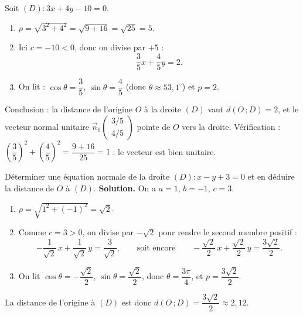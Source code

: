 \documentclass[11pt]{article}
\begin{document}
\begin{exemplebox}
Soit $(D) : 3x + 4y - 10 = 0$.
\begin{enumerate}
\item $\rho = \sqrt{3^2+4^2} = \sqrt{9+16} = \sqrt{25} = 5$.
\item Ici $c = -10 < 0$, donc on divise par $+5$ :
\[ \frac{3}{5}x + \frac{4}{5}y = 2. \]
\item On lit : $\cos\theta = \dfrac{3}{5}$, $\sin\theta = \dfrac{4}{5}$ (donc $\theta \approx 53{,}1^\circ$) et $p = 2$.
\end{enumerate}
Conclusion : la distance de l'origine $O$ à la droite $(D)$ vaut $d(O\,;D) = 2$, et le vecteur normal unitaire $\vec{n}_0\begin{pmatrix} 3/5 \\ 4/5 \end{pmatrix}$ pointe de $O$ vers la droite. Vérification : $\left(\dfrac{3}{5}\right)^2+\left(\dfrac{4}{5}\right)^2 = \dfrac{9+16}{25}=1$ : le vecteur est bien unitaire.
\end{exemplebox}

\begin{exoresolu}
Déterminer une équation normale de la droite $(D) : x - y + 3 = 0$ et en déduire la distance de $O$ à $(D)$.
\tcblower
\textbf{Solution.} On a $a=1$, $b=-1$, $c=3$.
\begin{enumerate}
\item $\rho = \sqrt{1^2+(-1)^2} = \sqrt{2}$.
\item Comme $c = 3 > 0$, on divise par $-\sqrt{2}$ pour rendre le second membre positif :
\[ -\frac{1}{\sqrt{2}}\,x + \frac{1}{\sqrt{2}}\,y = \frac{3}{\sqrt{2}}, \qquad\text{soit encore}\qquad -\frac{\sqrt{2}}{2}\,x + \frac{\sqrt{2}}{2}\,y = \frac{3\sqrt{2}}{2}. \]
\item On lit $\cos\theta = -\dfrac{\sqrt{2}}{2}$, $\sin\theta = \dfrac{\sqrt{2}}{2}$, donc $\theta = \dfrac{3\pi}{4}$, et $p = \dfrac{3\sqrt{2}}{2}$.
\end{enumerate}
La distance de l'origine à $(D)$ est donc $d(O\,;D) = \dfrac{3\sqrt{2}}{2} \approx 2{,}12$.
\end{exoresolu}
\end{document}
